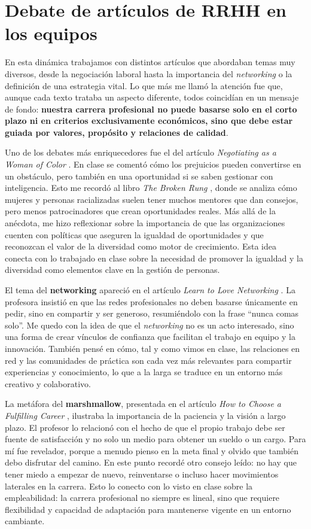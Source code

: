 \chapter{Debate de artículos de RRHH en los equipos}

En esta dinámica trabajamos con distintos artículos que abordaban temas muy diversos, desde la negociación laboral hasta la importancia del \emph{networking} o la definición de una estrategia vital. Lo que más me llamó la atención fue que, aunque cada texto trataba un aspecto diferente, todos coincidían en un mensaje de fondo: \textbf{nuestra carrera profesional no puede basarse solo en el corto plazo ni en criterios exclusivamente económicos, sino que debe estar guiada por valores, propósito y relaciones de calidad}. 

Uno de los debates más enriquecedores fue el del artículo \emph{Negotiating as a Woman of Color} \cite{hbr-woc-negotiation}. En clase se comentó cómo los prejuicios pueden convertirse en un obstáculo, pero también en una oportunidad si se saben gestionar con inteligencia. Esto me recordó al libro \emph{The Broken Rung} \cite{broken-rung}, donde se analiza cómo mujeres y personas racializadas suelen tener muchos mentores que dan consejos, pero menos patrocinadores que crean oportunidades reales. Más allá de la anécdota, me hizo reflexionar sobre la importancia de que las organizaciones cuenten con políticas que aseguren la igualdad de oportunidades y que reconozcan el valor de la diversidad como motor de crecimiento. Esta idea conecta con lo trabajado en clase sobre la necesidad de promover la igualdad y la diversidad como elementos clave en la gestión de personas.  

El tema del \textbf{networking} apareció en el artículo \emph{Learn to Love Networking} \cite{hbr-networking}. La profesora insistió en que las redes profesionales no deben basarse únicamente en pedir, sino en compartir y ser generoso, resumiéndolo con la frase “nunca comas solo”. Me quedo con la idea de que el \emph{networking} no es un acto interesado, sino una forma de crear vínculos de confianza que facilitan el trabajo en equipo y la innovación. También pensé en cómo, tal y como vimos en clase, las relaciones en red y las comunidades de práctica son cada vez más relevantes para compartir experiencias y conocimiento, lo que a la larga se traduce en un entorno más creativo y colaborativo.

La metáfora del \textbf{marshmallow}, presentada en el artículo \emph{How to Choose a Fulfilling Career} \cite{atlantic-fulfilling-career}, ilustraba la importancia de la paciencia y la visión a largo plazo. El profesor lo relacionó con el hecho de que el propio trabajo debe ser fuente de satisfacción y no solo un medio para obtener un sueldo o un cargo. Para mí fue revelador, porque a menudo pienso en la meta final y olvido que también debo disfrutar del camino. En este punto recordé otro consejo leído: no hay que tener miedo a empezar de nuevo, reinventarse o incluso hacer movimientos laterales en la carrera. Esto lo conecto con lo visto en clase sobre la empleabilidad: la carrera profesional no siempre es lineal, sino que requiere flexibilidad y capacidad de adaptación para mantenerse vigente en un entorno cambiante.  

